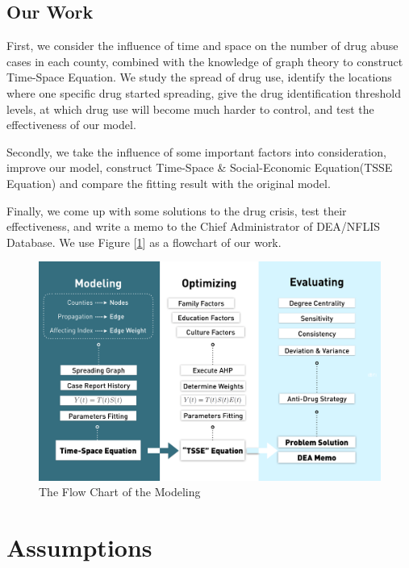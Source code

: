 \documentclass{mcmthesis}
\begin{document}
\subsection{Our Work}
First, we consider the influence of time and space on the number of drug abuse cases in each county, combined with the knowledge of graph theory to construct Time-Space Equation. We study the spread of drug use, identify the locations where one specific drug started spreading, give the drug identification threshold levels, at which drug use will become much harder to control, and test the effectiveness of our model.

Secondly, we take the influence of some important factors into consideration, improve our model, construct Time-Space \& Social-Economic Equation(TSSE Equation) and compare the fitting result with the original model.

Finally, we come up with some solutions to the drug crisis, test their effectiveness, and write a memo to the Chief Administrator of DEA/NFLIS Database. We use Figure [\ref{all_flowmap}] as a flowchart of our work.
\begin{figure}[h]
	\centering
	\includegraphics[width=15cm]{figure-release/ProgressMap.png}
	\caption{The Flow Chart of the Modeling}\label{all_flowmap}
\end{figure}

\section{Assumptions}
\end{document}
